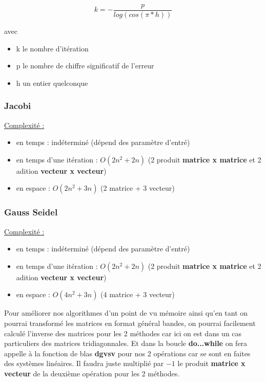\documentclass[11pt]{article}
\begin{document}
\begin{equation*}
  k = - \frac{p}{log(cos(\pi * h))}
\end{equation*}

avec

\begin{itemize}
\item k le nombre d'itération
\item p le nombre de chiffre significatif de l'erreur
\item h un entier quelconque
\end{itemize}

\subsubsection{Jacobi}

\underline{Complexité :}

\begin{itemize}
\item en temps : indéterminé (dépend des paramètre d'entré)
\item en temps d'une itération : $O(2n^2 + 2n)$ (2 produit \textbf{matrice x
  matrice} et 2 adition \textbf{vecteur x vecteur})
\item en espace : $O(2n^2 + 3n)$ (2 matrice + 3 vecteur)
\end{itemize}

\subsubsection{Gauss Seidel}

\underline{Complexité :}

\begin{itemize}
\item en temps : indéterminé (dépend des paramètre d'entré)
\item en temps d'une itération : $O(2n^2 + 2n)$ (2 produit \textbf{matrice x
  matrice} et 2 adition \textbf{vecteur x vecteur})
\item en espace : $O(4n^2 + 3n)$ (4 matrice + 3 vecteur)
\end{itemize}

Pour améliorer nos algorithmes d'un point de vu mémoire ainsi qu'en
tant on pourrai transformé les matrices en format général bandes, on
pourrai facilement calculé l'inverse des matrices pour les 2 méthodes
car ici on est dans un cas particuliers des matrices
tridiagonnales. Et dans la boucle \textbf{do...while} on fera appelle
à la fonction de blas \textbf{dgvsv} pour nos 2 opérations car se sont
en faites des systèmes linéaires. Il faudra juste multiplié par $-1$
le produit \textbf{matrice x vecteur} de la deuxième opération pour
les 2 méthodes.
\end{document}

